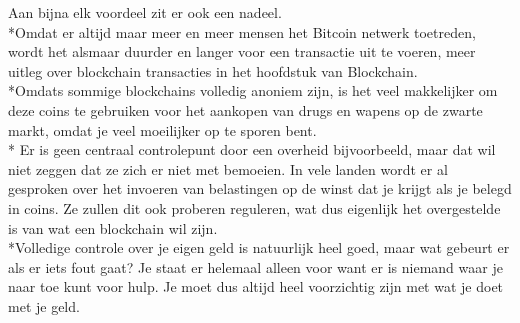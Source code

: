 \documentclass[fleqn,a4paper,12pt]{book}
\begin{document}
Aan bijna elk voordeel zit er ook een nadeel.\\*Omdat er altijd maar meer en meer mensen het Bitcoin netwerk toetreden, wordt het alsmaar duurder en langer voor een transactie uit te voeren, meer uitleg over blockchain transacties in het hoofdstuk van Blockchain.\\*Omdats sommige blockchains volledig anoniem zijn, is het veel makkelijker om deze coins te gebruiken voor het aankopen van drugs en wapens op de zwarte markt, omdat je veel moeilijker op te sporen bent.\\* Er is geen centraal controlepunt door een overheid bijvoorbeeld, maar dat wil niet zeggen dat ze zich er niet met bemoeien. In vele landen wordt er al gesproken over het invoeren van belastingen op de winst dat je krijgt als je belegd in coins. Ze zullen dit ook proberen reguleren, wat dus eigenlijk het overgestelde is van wat een blockchain wil zijn.\\*Volledige controle over je eigen geld is natuurlijk heel goed, maar wat gebeurt er als er iets fout gaat? Je staat er helemaal alleen voor want er is niemand waar je naar toe kunt voor hulp. Je moet dus altijd heel voorzichtig zijn met wat je doet met je geld.  
~\autocite{voor1}
\end{document}
